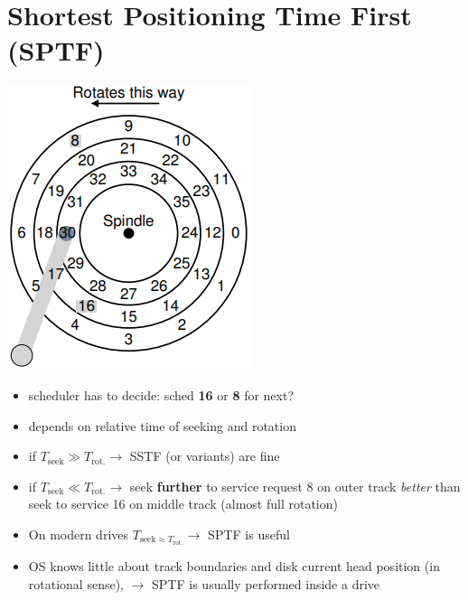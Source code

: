 \section*{Shortest Positioning Time First (SPTF)}
\begin{minipage}{.3\linewidth}
  \includegraphics[width=\linewidth]{imgs/disk_sstf1}
\end{minipage}
\begin{minipage}{.7\linewidth}
  \flushleft
  \begin{itemize}
  \item scheduler has to decide: sched \textbf{16} or \textbf{8} for next?
  \item depends on relative time of seeking and rotation
  \item if $T_{\text{seek}} \gg T_{\text{rot.}} \to$ SSTF (or variants) are fine
  \item if $T_{\text{seek}} \ll T_{\text{rot.}} \to$ seek \textbf{further} to service request 8 on outer track \emph{better} than seek to service 16 on middle track (almost full rotation)
  \item On modern drives $T_{\text{seek} \approx T_{\text{rot.}}} \to$ SPTF is useful
  \item OS knows little about track boundaries and disk current head position (in rotational sense), $\to$ SPTF is usually performed inside a drive
  \end{itemize}
\end{minipage}
